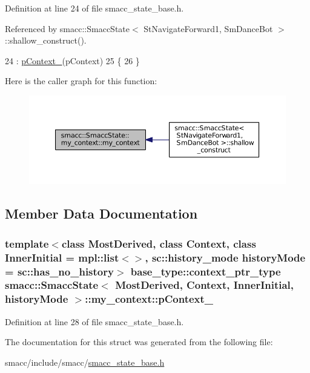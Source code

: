 Definition at line 24 of file smacc\+\_\+state\+\_\+base.\+h.



Referenced by smacc\+::\+Smacc\+State$<$ St\+Navigate\+Forward1, Sm\+Dance\+Bot $>$\+::shallow\+\_\+construct().


\begin{DoxyCode}
24                                                             : \hyperlink{structsmacc_1_1SmaccState_1_1my__context_a85f6eff5aba687932efe3f8117be76d3}{pContext\_}(pContext)
25     \{
26     \}
\end{DoxyCode}


Here is the caller graph for this function\+:
\nopagebreak
\begin{figure}[H]
\begin{center}
\leavevmode
\includegraphics[width=350pt]{structsmacc_1_1SmaccState_1_1my__context_af9c11c27b17bbf7de0d4e21c87d49f6f_icgraph}
\end{center}
\end{figure}




\subsection{Member Data Documentation}
\subsubsection[{\texorpdfstring{p\+Context\+\_\+}{pContext_}}]{\setlength{\rightskip}{0pt plus 5cm}template$<$class Most\+Derived, class Context, class Inner\+Initial = mpl\+::list$<$$>$, sc\+::history\+\_\+mode history\+Mode = sc\+::has\+\_\+no\+\_\+history$>$ base\+\_\+type\+::context\+\_\+ptr\+\_\+type {\bf smacc\+::\+Smacc\+State}$<$ Most\+Derived, Context, Inner\+Initial, history\+Mode $>$\+::my\+\_\+context\+::p\+Context\+\_\+}\hypertarget{structsmacc_1_1SmaccState_1_1my__context_a85f6eff5aba687932efe3f8117be76d3}{}\label{structsmacc_1_1SmaccState_1_1my__context_a85f6eff5aba687932efe3f8117be76d3}


Definition at line 28 of file smacc\+\_\+state\+\_\+base.\+h.



The documentation for this struct was generated from the following file\+:\begin{DoxyCompactItemize}
\item 
smacc/include/smacc/\hyperlink{smacc__state__base_8h}{smacc\+\_\+state\+\_\+base.\+h}\end{DoxyCompactItemize}
